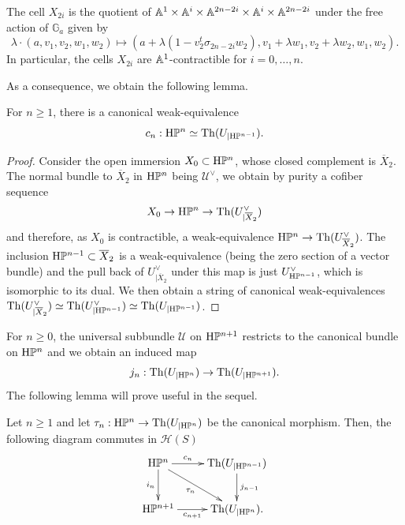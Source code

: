 \begin{num}
\begin{lm}
The cell $X_{2i}$ is the quotient of $\AA^1\times \AA^i\times \AA^{2n-2i}\times \AA^i\times \AA^{2n-2i}$ under the free action of $\mathbb{G}_a$ given by
\[
\lambda\cdot (a,v_1,v_2,w_1,w_2)\mapsto (a+\lambda(1-v_2^t\sigma_{2n-2i}w_2),v_1+\lambda w_1,v_2+\lambda w_2,w_1,w_2).
\]
In particular, the cells $X_{2i}$ are $\AA^1$-contractible for $i=0,\ldots,n$.
\end{lm}

As a consequence, we obtain the following lemma. 

\begin{lm}
For $n\geq 1$, there is a canonical weak-equivalence 
\[
c_n:\HP^n\simeq \mathrm{Th}(U_{\vert \HP^{n-1}}).
\]
\end{lm}

\begin{proof}
Consider the open immersion $X_0\subset \HP^n$, whose closed complement is $\overline X_2$. The normal bundle to $\overline X_2$ in $\HP^n$ being $\mathcal{U}^\vee$, we obtain by purity a cofiber sequence
\[
X_0\to\HP^n\to  \mathrm{Th}(U^\vee_{\vert\overline X_2})
\]
and therefore, as $X_0$ is contractible, a weak-equivalence $\HP^n\to  \mathrm{Th}(U^\vee_{\overline X_2})$. The inclusion $\HP^{n-1}\subset \overline X_2$ is a weak-equivalence (being the zero section of a vector bundle) and the pull back of $U^\vee_{\vert\overline X_2}$ under this map is just $U^\vee_{\HP^{n-1}}$, which is isomorphic to its dual. We then obtain a string of canonical weak-equivalences $\mathrm{Th}(U^\vee_{\vert\overline X_2})\simeq \mathrm{Th}(U^\vee_{\vert \HP^{n-1}})\simeq \mathrm{Th}(U_{\vert \HP^{n-1}})$.
\end{proof}

For $n\geq 0$, the universal subbundle $\mathcal U$ on $\HP^{n+1}$ restricts to the canonical bundle on $\HP^n$ and we obtain an induced map 
\[
j_n:\mathrm{Th}(U_{\vert \HP^{n}})\to \mathrm{Th}(U_{\vert \HP^{n+1}}).
\]
The following lemma will prove useful in the sequel. 

\begin{lm}\label{lem:fundamental}
Let $n\geq 1$ and let $\tau_n:\HP^n\to \mathrm{Th}(U_{\vert \HP^{n}})$ be the canonical morphism.
Then, the following diagram commutes in $\mathcal{H}(S)$
\[
\xymatrix{\HP^n\ar[r]^-{c_n}\ar[d]_-{i_n}\ar[rd]_-{\tau_n} & \mathrm{Th}(U_{\vert \HP^{n-1}})\ar[d]^-{j_{n-1}}  \\
\HP^{n+1}\ar[r]_-{c_{n+1}} &  \mathrm{Th}(U_{\vert \HP^{n}}).
}
\]
\end{lm}


\end{num}

